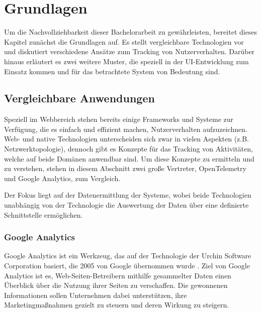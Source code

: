 \chapter{Grundlagen}
\label{cha:grundlagen}
Um die Nachvollziehbarkeit dieser Bachelorarbeit zu gewährleisten, bereitet dieses Kapitel zunächst die Grundlagen auf. Es stellt vergleichbare Technologien vor und diskutiert verschiedene Ansätze zum Tracking von Nutzerverhalten. Darüber hinaus erläutert es zwei weitere Muster, die speziell in der UI-Entwicklung zum Einsatz kommen und für das betrachtete System von Bedeutung sind.

\section{Vergleichbare Anwendungen}
\label{sec:similar_applications}
Speziell im Webbereich stehen bereits einige Frameworks und Systeme zur Verfügung, die es einfach und effizient machen, Nutzerverhalten aufzuzeichnen. Web- und native Technologien unterscheiden sich zwar in vielen Aspekten (z.B. Netzwerktopologie), dennoch gibt es Konzepte für das Tracking von Aktivitäten, welche auf beide Domänen anwendbar sind. Um diese Konzepte zu ermitteln und zu verstehen, stehen in diesem Abschnitt zwei große Vertreter, OpenTelemetry und Google Analytics, zum Vergleich.

Der Fokus liegt auf der Datenermittlung der Systeme, wobei beide Technologien unabhängig von der Technologie die Auswertung der Daten über eine definierte Schnittstelle ermöglichen.

\subsection{Google Analytics}
\label{subsec:google_analytics}

Google Analytics \cite{weber2015practical} ist ein Werkzeug, das auf der Technologie der Urchin Software Corporation basiert, die 2005 von Google übernommen wurde \cite{google2005urchin}. Ziel von Google Analytics ist es, Web-Seiten-Betreibern mithilfe gesammelter Daten einen Überblick über die Nutzung ihrer Seiten zu verschaffen. Die gewonnenen Informationen sollen Unternehmen dabei unterstützen, ihre Marketingmaßnahmen gezielt zu steuern und deren Wirkung zu steigern.

